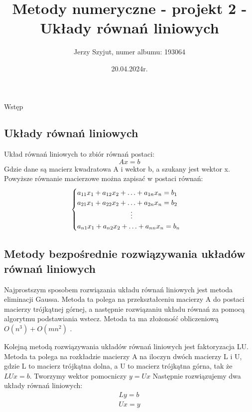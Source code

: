 \documentclass{article}
\title{Metody numeryczne - projekt 2 - Układy równań liniowych}
\author{Jerzy Szyjut, numer albumu: 193064}
\date{20.04.2024r.}
\begin{document}
\maketitle

\begin{section}{Wstęp}
    \subsection{Układy równań liniowych}
    Układ równań liniowych to zbiór równań postaci:
    \begin{equation}
        Ax = b
    \end{equation}
    Gdzie dane są macierz kwadratowa A i wektor b, a szukany jest wektor x.
    Powyższe równanie macierzowe można zapisać w postaci równań:
    \begin{equation*}
        \begin{cases}
            a_{11}x_1 + a_{12}x_2 + \ldots + a_{1n}x_n = b_1 \\
            a_{21}x_1 + a_{22}x_2 + \ldots + a_{2n}x_n = b_2 \\
            \hspace{27 mm} \vdots \\
            a_{n1}x_1 + a_{n2}x_2 + \ldots + a_{nn}x_n = b_n
        \end{cases}
    \end{equation*}

    \subsection{Metody bezpośrednie rozwiązywania układów równań liniowych}
    Najprostszym sposobem rozwiązania układu równań liniowych jest metoda eliminacji Gaussa.
    Metoda ta polega na przekształceniu macierzy A do postaci macierzy trójkątnej górnej, a następnie
    rozwiązaniu układu równań za pomocą algorytmu podstawiania wstecz. Metoda ta ma złożoność obliczeniową
    $O(n^3) + O(mn^2)$ \cite{wyklad1}.

    Kolejną metodą rozwiązywania układów równań liniowych jest faktoryzacja LU. Metoda ta polega na
    rozkładzie macierzy A na iloczyn dwóch macierzy L i U, gdzie L to macierz trójkątna dolna, a U to
    macierz trójkątna górna, tak że $LUx = b$. Tworzymy wektor pomocniczy $y = Ux$
    Następnie rozwiązujemy dwa układy równań liniowych:
    \begin{align*}
        Ly = b \\
        Ux = y
    \end{align*}


\end{section}
\end{document}
